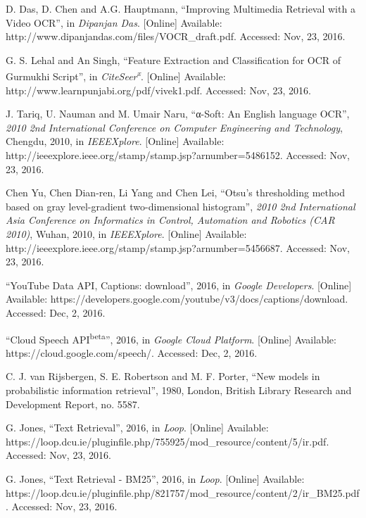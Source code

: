 \documentclass[a4paper,12pt]{article}
\begin{document}
\newpage

\begin{thebibliography}{9}

    D. Das,
    D. Chen
    and A.G. Hauptmann,
    ``Improving Multimedia Retrieval with a Video OCR'',
    in \emph{Dipanjan Das}.
    [Online]
    Available: http://www.dipanjandas.com/files/VOCR\_draft.pdf.
    Accessed: Nov, 23, 2016.

    G. S. Lehal
    and An Singh,
    ``Feature Extraction and Classification for OCR of Gurmukhi Script'',
    in \emph{CiteSeer\textsuperscript{x}}.
    [Online]
    Available: http://www.learnpunjabi.org/pdf/vivek1.pdf.
    Accessed: Nov, 23, 2016.

    J. Tariq,
    U. Nauman
    and M. Umair Naru,
    ``α-Soft: An English language OCR'',
    \emph{2010 2nd International Conference on Computer Engineering and Technology},
    Chengdu,
    2010,
    in \emph{IEEEXplore\textregistered}.
    [Online]
    Available: http://ieeexplore.ieee.org/stamp/stamp.jsp?arnumber=5486152.
    Accessed: Nov, 23, 2016.

    Chen Yu,
    Chen Dian-ren,
    Li Yang
    and Chen Lei,
    ``Otsu's thresholding method based on gray level-gradient two-dimensional histogram'',
    \emph{2010 2nd International Asia Conference on Informatics in Control, Automation and Robotics (CAR 2010)},
    Wuhan,
    2010,
    in \emph{IEEEXplore\textregistered}.
    [Online]
    Available: http://ieeexplore.ieee.org/stamp/stamp.jsp?arnumber=5456687.
    Accessed: Nov, 23, 2016.

    ``YouTube Data API, Captions: download'',
    2016,
    in \emph{Google Developers}.
    [Online]
    Available: https://developers.google.com/youtube/v3/docs/captions/download.
    Accessed: Dec, 2, 2016.

    ``Cloud Speech API\textsuperscript{beta}'',
    2016,
    in \emph{Google Cloud Platform}.
    [Online]
    Available: https://cloud.google.com/speech/.
    Accessed: Dec, 2, 2016.

    C. J. van Rijsbergen,
    S. E. Robertson
    and M. F. Porter,
    ``New models in probabilistic information retrieval'',
    1980,
    London,
    British Library Research and Development Report, no. 5587.

    G. Jones,
    ``Text Retrieval'',
    2016,
    in \emph{Loop}.
    [Online]
    Available: https://loop.dcu.ie/pluginfile.php/755925/mod\_resource/content/5/ir.pdf.
    Accessed: Nov, 23, 2016.

    G. Jones,
    ``Text Retrieval - BM25'',
    2016,
    in \emph{Loop}.
    [Online]
    Available: https://loop.dcu.ie/pluginfile.php/821757/mod\_resource/content/2/ir\_BM25.pdf.
    Accessed: Nov, 23, 2016.



\end{thebibliography}
\end{document}
